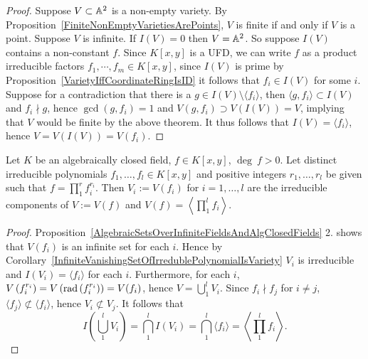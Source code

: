 \begin{proof}
    Suppose $V\subset \mathbb{A}^2$ is a non-empty variety. By Proposition~\ref{FiniteNonEmptyVarietiesArePoints}, $V$ is finite if and only if $V$ is a point. Suppose $V$ is infinite. If $I(V) = 0$ then $V= \mathbb{A}^2$. So suppose $I(V)$ contains a non-constant $f$. Since $K[x,y]$ is a UFD, we can write $f$ as a product irreducible factors $f_1,\cdots, f_m\in K[x,y]$, since $I(V)$ is prime by Proposition~\ref{VarietyIffCoordinateRingIsID} it follows that $f_i\in I(V)$ for some $i$. Suppose for a contradiction that there is a $g\in I(V)\setminus \langle f_i\rangle$, then $\langle g,f_i\rangle \subset I(V)$ and $f_i\nmid g$, hence $\gcd(g,f_i)=1$ and $V(g,f_i)\supset V(I(V))=V$, implying that $V$ would be finite by the above theorem. It thus follows that $I(V)=\langle f_i\rangle$, hence $V=V(I(V))=V(f_i)$. 
\end{proof}
\begin{corollary}
    Let $K$ be an algebraically closed field, $f\in K[x,y]$, $\deg \ f >0$. Let distinct irreducible polynomials $f_1,\dots,f_l\in K[x,y]$ and positive integers $r_1,\dots,r_l$ be given such that $f =  \prod_1^r f_i^{r_i}$. Then $V_i:= V(f_i)$ for $i=1,\dots,l$ are the irreducible components of $V:=V(f)$ and $V(f)=\left\langle \prod_1^l f_i \right\rangle$. 
\end{corollary}
\begin{proof}
    Proposition~\ref{AlgebraicSetsOverInfiniteFieldsAndAlgClosedFields} 2. shows that $V(f_i)$ is an infinite set for each $i$. Hence by Corollary~\ref{InfiniteVanishingSetOfIrredublePolynomialIsVariety} $V_i$ is irreducible and $I(V_i)=\langle f_i\rangle$ for each $i$. Furthermore, for each $i$, $V\left(f_i^{r_i}\right)= V\left(\mathrm{rad}\left(f_i^{r_i}\right)\right) = V(f_i)$, hence $V = \bigcup_1^l V_i$. Since $f_i\nmid f_j$ for $i\neq j$, $\langle f_j\rangle \not\subset \langle f_i\rangle$, hence $V_i\not\subset V_j$. It follows that 
    $$I\left(\bigcup_1^l V_i\right) = \bigcap_1^l I(V_i)= \bigcap_1^l \langle f_i\rangle = \left\langle\prod_1^l f_i\right\rangle.$$

\end{proof}
